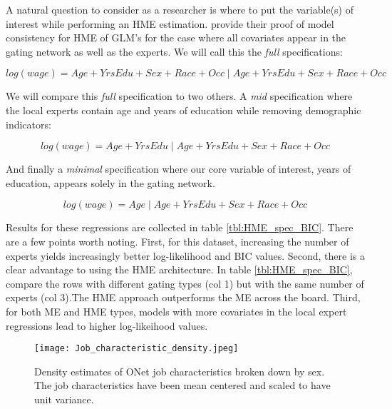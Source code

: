 \documentclass[12pt]{article}
\begin{document}
A natural question to consider as a researcher is where to put the variable(s)
of interest while performing an HME estimation. \cite{JiangTanner2000}
provide their proof of model consistency for HME of GLM's for the case where
all covariates appear in the gating network as well as the experts. We will
call this the \textit{full} specifications:

\begin{equation}
  log(wage) = Age + YrsEdu + Sex +  Race + Occ \; | \; Age + YrsEdu + Sex +  Race + Occ
\end{equation}

We will compare this \textit{full} specification to two others. A
\textit{mid} specification where the local experts contain age and
years of education while removing demographic indicators:

\begin{equation}
  log(wage) = Age + YrsEdu \; | \; Age + YrsEdu + Sex +  Race + Occ
\end{equation}

And finally a \textit{minimal} specification where our core variable
of interest, years of education, appears solely in the gating network.

\begin{equation}
  log(wage) = Age \; | \; Age + YrsEdu + Sex +  Race + Occ
\end{equation}

Results for these regressions are collected in table \ref{tbl:HME_spec_BIC}.
There are a few points worth noting. First, for this dataset, increasing the
number of experts yields increasingly better log-likelihood and BIC values.
Second, there is a clear advantage to using the HME architecture. In table
\ref{tbl:HME_spec_BIC}, compare the rows with different gating types (col 1)
but with the same number of experts (col 3).The HME approach outperforms the
ME across the board. Third, for both ME and HME types, models with more
covariates in the local expert regressions lead to higher log-likeihood
values. 

\begin{figure}[!ht]
  \texttt{[image: Job\_characteristic\_density.jpeg]}
  \caption{Density estimates of ONet job characteristics broken down by
  sex. The job characteristics have been mean centered and scaled to
  have unit variance.}
  \label{fig:JobChar_vs_sex}
\end{figure}
\end{document}

